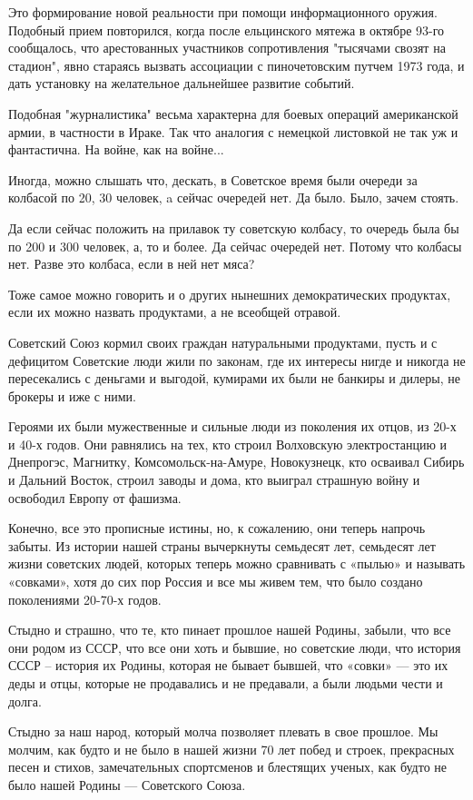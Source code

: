 \documentclass[a4paper,11pt]{extreport}
\begin{document}
Это формирование новой реальности при помощи информационного оружия. Подобный
прием повторился, когда после ельцинского мятежа в октябре 93-го сообщалось,
что арестованных участников сопротивления "тысячами свозят на стадион", явно
стараясь вызвать ассоциации с пиночетовским путчем 1973 года, и дать установку
на желательное дальнейшее развитие событий.

Подобная "журналистика" весьма характерна для боевых операций американской
армии, в частности в Ираке. Так что аналогия с немецкой листовкой не так уж и
фантастична. На войне, как на войне...

Иногда, можно слышать что, дескать, в Советское время были очереди за колбасой
по 20, 30 человек, a сейчас очередей нет. Да было. Было, зачем стоять.

Да если сейчас положить на прилавок ту советскую колбасу, то очередь была бы по
200 и 300 человек, а, то и более. Да сейчас очередей нет. Потому что колбасы
нет. Разве это колбаса, если в ней нет мяса?

Тоже самое можно говорить и о других нынешних демократических продуктах, если
их можно назвать продуктами, а не всеобщей отравой.

Советский Союз кормил своих граждан натуральными продуктами, пусть и с
дефицитом Советские люди жили по законам, где их интересы нигде и никогда не
пересекались с деньгами и выгодой, кумирами их были не банкиры и дилеры, не
брокеры и иже с ними.

Героями их были мужественные и сильные люди из поколения их отцов, из 20-х и
40-х годов.  Они равнялись на тех, кто строил Волховскую электростанцию и
Днепрогэс, Магнитку, Комсомольск-на-Амуре, Новокузнецк, кто осваивал Сибирь и
Дальний Восток, строил заводы и дома, кто выиграл страшную войну и освободил
Европу от фашизма.

Конечно, все это прописные истины, но, к сожалению, они теперь напрочь забыты.
Из истории нашей страны вычеркнуты семьдесят лет, семьдесят лет жизни советских
людей, которых теперь можно сравнивать с «пылью» и называть «совками», хотя до
сих пор Россия и все мы живем тем, что было создано поколениями 20-70-х годов.

Стыдно и страшно, что те, кто пинает прошлое нашей Родины, забыли, что все они
родом из СССР, что все они хоть и бывшие, но советские люди, что история СССР –
история их Родины, которая не бывает бывшей, что «совки» --- это их деды и отцы,
которые не продавались и не предавали, а были людьми чести и долга.

Стыдно за наш народ, который молча позволяет плевать в свое прошлое. Мы молчим,
как будто и не было в нашей жизни 70 лет побед и строек, прекрасных песен и
стихов, замечательных спортсменов и блестящих ученых, как будто не было нашей
Родины --- Советского Союза.
\end{document}
